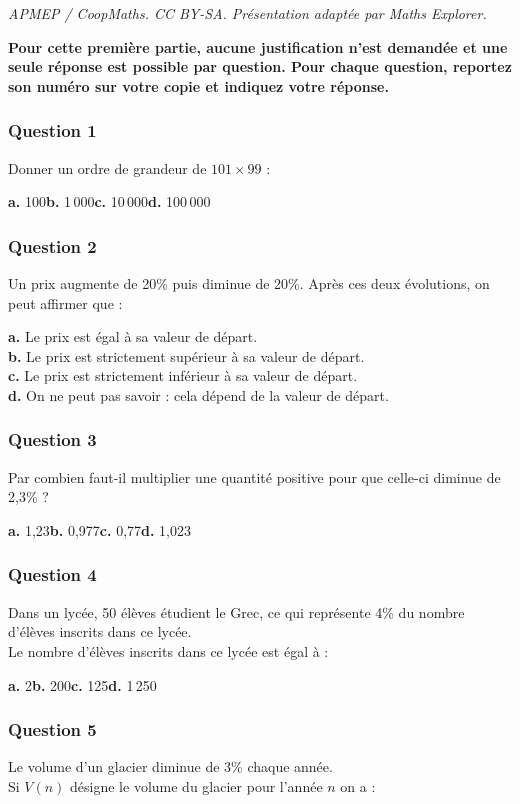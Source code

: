 \documentclass[10pt]{article}
\begin{document}
\noindent\textit{APMEP / CoopMaths. CC BY-SA. Présentation adaptée par Maths Explorer.}\par\medskip
\textbf{Pour cette première partie, aucune justification n'est demandée et une seule réponse est possible par question. Pour chaque question, reportez son numéro sur votre copie et indiquez votre réponse.}

\subsubsection*{Question 1}
Donner un ordre de grandeur de $101 \times 99$ :

\textbf{a.} 100\hfill \textbf{b.} 1\,000\hfill \textbf{c.} 10\,000\hfill \textbf{d.} 100\,000

\subsubsection*{Question 2}
Un prix augmente de 20\% puis diminue de 20\%. Après ces deux évolutions, on peut affirmer que :

\textbf{a.} Le prix est égal à sa valeur de départ. \\
\textbf{b.} Le prix est strictement supérieur à sa valeur de départ. \\
\textbf{c.} Le prix est strictement inférieur à sa valeur de départ. \\
\textbf{d.} On ne peut pas savoir : cela dépend de la valeur de départ.

\subsubsection*{Question 3}
Par combien faut-il multiplier une quantité positive pour que celle-ci diminue de 2,3\% ?

\textbf{a.} 1,23\hfill \textbf{b.} 0,977\hfill \textbf{c.} 0,77\hfill \textbf{d.} 1,023

\subsubsection*{Question 4}
Dans un lycée, 50 élèves étudient le Grec, ce qui représente 4\% du nombre d'élèves inscrits dans ce lycée. \\
Le nombre d'élèves inscrits dans ce lycée est égal à :

\textbf{a.} 2\hfill \textbf{b.} 200\hfill \textbf{c.} 125\hfill \textbf{d.} 1\,250

\subsubsection*{Question 5}
Le volume d'un glacier diminue de 3\% chaque année. \\
Si $V(n)$ désigne le volume du glacier pour l'année $n$ on a :
\end{document}
